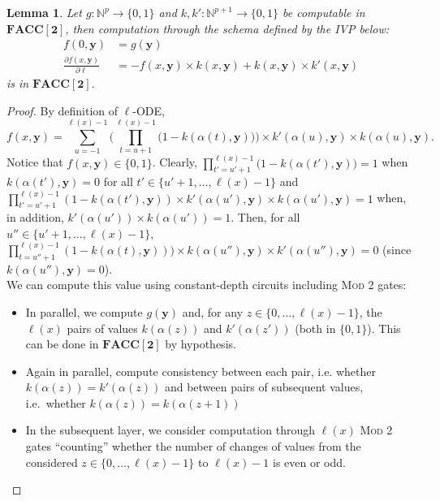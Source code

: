 \documentclass[11pt, oneside]{article}
\newcommand{\Nat}{\mathbb{N}}
\newcommand{\FACC}{\mathbf{FACC[2]}}
\newcommand{\tu}[1]{\mathbf{#1}}
\newtheorem{lemma}{Lemma}
\theoremstyle{definition}
\begin{document}
\begin{toappendix}
\begin{lemma}\label{lemma:kkODE}
    Let $g:\Nat^p\to \{0,1\}$ and $k, k':\Nat^{p+1}\to \{0,1\}$ be computable in $\FACC$, then computation through the schema defined by the IVP below:
    \begin{align*}
        f(0, \tu y) &= g(\tu y) \\
        \frac{\partial f(x, \tu y)}{\partial \ell} &= - f(x, \tu y) \times k(x, \tu y) + k(x, \tu y) \times k'(x, \tu y)
    \end{align*}
    is in $\FACC$.
\end{lemma}

    
\begin{proof}
By definition of $\ell$-ODE,
$$
f(x, \tu y) = \sum^{\ell(x)-1}_{u=-1} \Bigg(\prod^{\ell(x)-1}_{t=u+1} \Big(1-k(\alpha(t), \tu y)\Big) \Bigg) \times k'(\alpha(u), \tu y) \times k(\alpha(u), \tu y).
$$
Notice that $f(x, \tu y)\in \{0,1\}$.
%
Clearly, $\prod^{\ell(x)-1}_{t'=u'+1}\big(1-k(\alpha(t'), \tu y)\big)=1$ when $k(\alpha(t'), \tu y)=0$ for all $t'\in \{u'+1, \dots, \ell(x)-1\}$ and $\prod^{\ell(x)-1}_{t'=u'+1}(1-k(\alpha(t'), \tu y))\times k'(\alpha(u'), \tu y) \times k(\alpha(u'), \tu y) =1$ when, in addition, $k'(\alpha(u')) \times k(\alpha(u'))=1$.
%
Then, for all $u''\in \{u'+1, \dots, \ell(x)-1\}$, $\prod^{\ell(x)-1}_{t=u''+1} (1-k(\alpha(t), \tu y)) \big) \times k(\alpha(u''), \tu y) \times k'(\alpha(u''), \tu y)=0$ (since $k(\alpha(u''),\tu y)=0$).
\\
We can compute this value using constant-depth circuits including %
\textsc{Mod 2} gates:
%
\begin{itemize}
    \itemsep0em
    \item In parallel, we compute $g(\tu y)$ and, for any $z\in \{0, \dots, \ell(x)-1\}$, the $\ell(x)$ pairs of values $k(\alpha(z))$ and $k'(\alpha(z'))$ (both in $\{0,1\}$).
    This can be done in $\FACC$ by hypothesis.
    \item Again in parallel, compute consistency between each pair, i.e. whether $k(\alpha(z)) = k'(\alpha(z))$ and between pairs of subsequent values, i.e.~whether $k(\alpha(z))=k(\alpha(z+1))$
    \item In the subsequent layer, we consider computation through $\ell(x)$ \textsc{Mod 2} gates ``counting'' whether the number of changes of values from the considered $z\in \{0, \dots, \ell(x)-1\}$ to $\ell(x)-1$ is even or odd.

\end{itemize}
\end{proof}
\end{toappendix}
\end{document}
